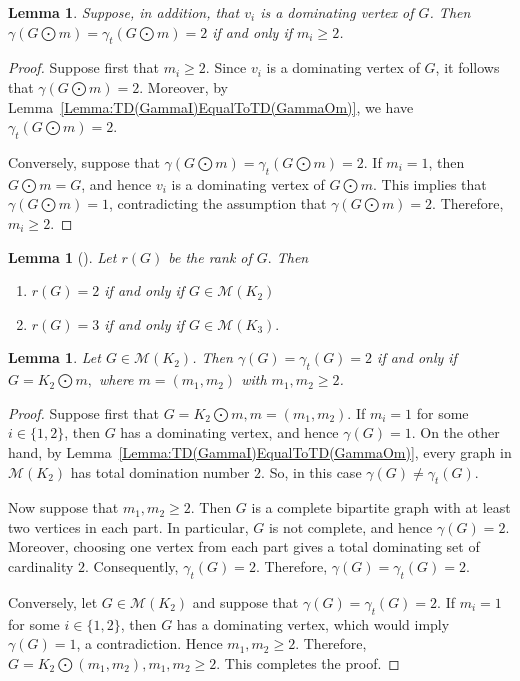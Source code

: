 \documentclass[12pt]{amsart}
\theoremstyle{plain}
\newtheorem{lemma}[theorem]{Lemma}
\theoremstyle{definition}
\begin{document}
\begin{lemma}\label{lemma:dn=1-tdn=dn=2-iff}
Suppose, in addition, that $v_i$ is a dominating vertex of $G$. Then
$\gamma(G\bigodot m)=\gamma_t(G\bigodot m)=2$ if and only if $m_i\geq 2$.
\end{lemma}

\begin{proof}
Suppose first that $m_i\geq 2$. Since $v_i$ is a dominating vertex of $G$, it follows that $\gamma(G\bigodot m)=2$. Moreover, by Lemma~\ref{Lemma:TD(GammaI)EqualToTD(GammaOm)}, we have $\gamma_t(G\bigodot m)=2$.

Conversely, suppose that $\gamma(G\bigodot m)=\gamma_t(G\bigodot m)=2$. If $m_i=1$, then $G\bigodot m=G$, and hence $v_i$ is a dominating vertex of $G\bigodot m$. This implies that $\gamma(G\bigodot m)=1$, contradicting the assumption that $\gamma(G\bigodot m)=2$. Therefore, $m_i\geq 2$.
\end{proof}


\begin{lemma}[\cite{Nulity-of-graphs-ELA,Nulity-bicyclic-graph,Rank-of-graphs-Sc}]\label{lemma: cha of graphs rank leq 3}
	Let $r(G)$ be the rank of $G.$ Then 
	\begin{enumerate}
		\item $r(G)=2$ if and only if $G\in \mathcal{M}(K_2)$
		\item $r(G)=3$ if and only if $G\in \mathcal{M}(K_3).$
	\end{enumerate}	
\end{lemma}


\begin{lemma}\label{lemma:rank-2-dn=tdn=2-iff}
Let $G\in\mathcal{M}(K_2)$. Then
$\gamma(G)=\gamma_t(G)=2$
if and only if
$G=K_2\bigodot m,$
where $m=(m_1,m_2)$ with $m_1,m_2\geq 2$.
\end{lemma}

\begin{proof}
Suppose first that
$G=K_2\bigodot m,
 m=(m_1,m_2).$
If $m_i=1$ for some $i\in\{1,2\}$, then $G$ has a dominating
vertex, and hence
$\gamma(G)=1.$
On the other hand, by Lemma~\ref{Lemma:TD(GammaI)EqualToTD(GammaOm)},
every graph in $\mathcal{M}(K_2)$ has total domination number $2.$ So, in this case
$\gamma(G)\neq\gamma_t(G).$

Now suppose that $m_1, m_2\geq2$. Then $G$ is a complete bipartite
graph with at least two vertices in each part. In particular, $G$ is
not complete, and hence
$\gamma(G)=2.$
Moreover, choosing one vertex from each part gives a total dominating
set of cardinality $2$. Consequently,
$\gamma_t(G)=2.$
Therefore,
$\gamma(G)=\gamma_t(G)=2.$

Conversely, let $G\in\mathcal{M}(K_2)$ and suppose that
$\gamma(G)=\gamma_t(G)=2.$
If $m_i=1$ for some $i\in\{1,2\}$, then $G$ has a dominating vertex,
which would imply $\gamma(G)=1$, a contradiction. Hence
$m_1,m_2\geq2$. Therefore,
$G=K_2\bigodot(m_1,m_2),
m_1,m_2\geq2.$
This completes the proof.
\end{proof}
\end{document}
